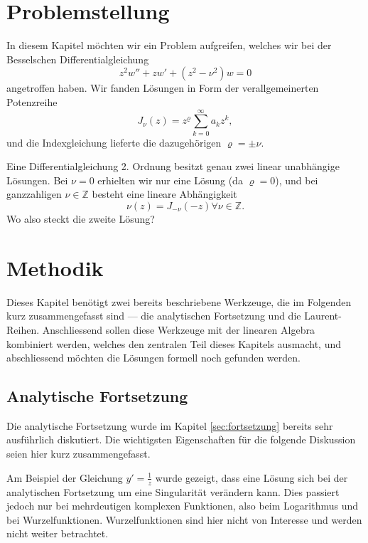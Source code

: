 \section{Problemstellung}

In diesem Kapitel möchten wir ein Problem aufgreifen, welches wir bei der Besselschen Differentialgleichung
\[ z^2w''+zw'+(z^2 - \nu^2)w=0\]
angetroffen haben. 
Wir fanden Lösungen in Form der verallgemeinerten Potenzreihe
\[J_\nu(z)=z^\varrho\sum_{k=0}^{\infty}a_kz^k,\]
und die Indexgleichung lieferte die dazugehörigen $\varrho=\pm\nu.$

\begin{problem*} 
 Eine Differentialgleichung 2. Ordnung besitzt genau zwei linear unabhängige Lösungen.
 Bei $\nu=0$ erhielten wir nur eine Lösung (da $\varrho=0$), und bei ganzzahligen $\nu\in\mathbb{Z}$ besteht eine lineare Abhängigkeit
 \[\nu(z) = J_{-\nu}(-z)\forall\nu\in\mathbb{Z}.\]
Wo also steckt die zweite Lösung?
\end{problem*} 

\section{Methodik}
Dieses Kapitel benötigt zwei bereits beschriebene Werkzeuge, die im Folgenden kurz zusammengefasst sind --- die analytischen Fortsetzung und die Laurent-Reihen.
Anschliessend sollen diese Werkzeuge mit der linearen Algebra kombiniert werden, welches den zentralen Teil dieses Kapitels ausmacht, und abschliessend möchten die Lösungen formell noch gefunden werden.

\subsection{Analytische Fortsetzung}
%
Die analytische Fortsetzung wurde im Kapitel \ref{sec:fortsetzung} bereits sehr ausführlich diskutiert.
Die wichtigsten Eigenschaften für die folgende Diskussion seien hier kurz zusammengefasst.

Am Beispiel der Gleichung $y'=\frac{1}{z}$ wurde gezeigt, dass eine Lösung sich bei der analytischen Fortsetzung um eine Singularität verändern kann.
Dies passiert jedoch nur bei mehrdeutigen komplexen Funktionen, also beim Logarithmus und bei Wurzelfunktionen.
Wurzelfunktionen sind hier nicht von Interesse und werden nicht weiter betrachtet. 

